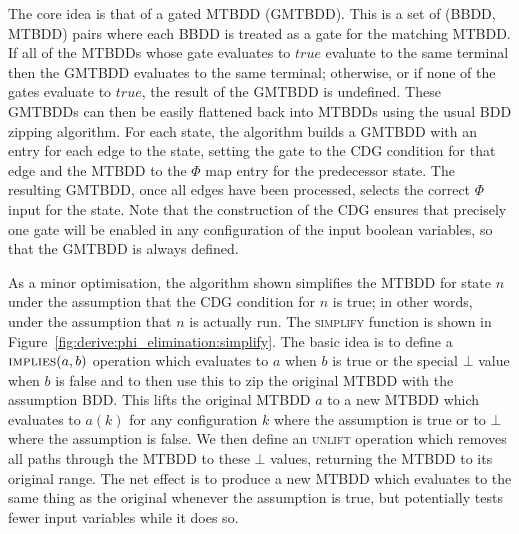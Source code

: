 The core idea is that of a gated MTBDD (GMTBDD).  This is a set of
(BBDD, MTBDD) pairs where each BBDD is treated as a gate for the
matching MTBDD.  If all of the MTBDDs whose gate evaluates to $true$
evaluate to the same terminal then the GMTBDD evaluates to the same
terminal; otherwise, or if none of the gates evaluate to $true$, the
result of the GMTBDD is undefined.  These GMTBDDs can then be easily
flattened back into MTBDDs using the usual BDD zipping
algorithm. For each state, the algorithm builds a GMTBDD with an
entry for each edge to the state, setting the gate to the CDG
condition for that edge and the MTBDD to the $\Phi$ map entry for the
predecessor state.  The resulting GMTBDD, once all edges have been
processed, selects the correct $\Phi$ input for the state.  Note that
the construction of the CDG ensures that precisely one gate will be
enabled in any configuration of the input boolean variables, so that
the GMTBDD is always defined.



As a minor optimisation, the algorithm shown simplifies the MTBDD for
state $n$ under the assumption that the CDG condition for $n$ is true;
in other words, under the assumption that $n$ is actually run.  The
\textsc{simplify} function is shown in
Figure~\ref{fig:derive:phi_elimination:simplify}.  The basic idea is
to define a $\textsc{implies}(a, b)$ operation which evaluates to $a$
when $b$ is true or the special $\bot$ value when $b$ is false and to
then use this to zip the original MTBDD with the assumption BDD.  This
lifts the original MTBDD $a$ to a new MTBDD which evaluates to $a(k)$
for any configuration $k$ where the assumption is true or to $\bot$
where the assumption is false.  We then define an \textsc{unlift}
operation which removes all paths through the MTBDD to these $\bot$
values, returning the MTBDD to its original range.  The net effect is
to produce a new MTBDD which evaluates to the same thing as the
original whenever the assumption is true, but potentially tests fewer
input variables while it does so.

